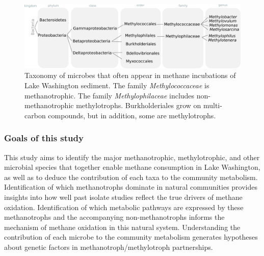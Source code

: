\begin{figure}[H]
\centering
    \includegraphics[width=1.0\textwidth]{./tex/chapter2/figures/170311_taxonomy_overview.pdf}
    \begin{singlespace}
    \caption[Taxonomy of microbes known to factor into methane oxidation in Lake Washington sediment]{
       Taxonomy of microbes that often appear in methane incubations of Lake Washington sediment.
       The family \textit{Methylococcaceae} is methanotrophic.
       The family \textit{Methylophilaceae} includes non-methanotrophic methylotrophs.
       Burkholderiales grow on multi-carbon compounds, but in addition, some are methylotrophs.}
    \label{fig:taxonomy}
    \end{singlespace}
\end{figure}

\subsubsection{Goals of this study}  %
This study aims to identify the major methanotrophic, methylotrophic, and other microbial species that together enable methane consumption in Lake Washington, as well as to deduce the contribution of each taxa to the community metabolism.
Identification of which methanotrophs dominate in natural communities provides insights into how well past isolate studies reflect the true drivers of methane oxidation.
Identification of which metabolic pathways are expressed by these methanotrophs and the accompanying non-methanotrophs informs the mechanism of methane oxidation in this natural system.
Understanding the contribution of each microbe to the community metabolism generates hypotheses about genetic factors in methanotroph/methylotroph partnerships.


